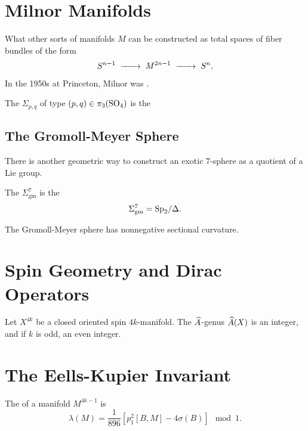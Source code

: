 
\section{Milnor Manifolds}

What other sorts of manifolds $M$ can be constructed as total spaces of fiber bundles of the form
\[
	S^{n-1} \lkxto M^{2n-1} \lkxto S^n.
\]

\begin{historicalremark*}
	In the 1950s at Princeton, Milnor was \cite{milnor2000exotic}. 
\end{historicalremark*}


\begin{definition}
	The  $\Sigma_{p,q}$ of type $(p,q)\in \pi_3({\operatorname{SO}}_4)$ is the
\end{definition}

\subsection*{The Gromoll-Meyer Sphere}

There is another geometric way to construct an exotic $7$-sphere as a quotient of a Lie group.

\begin{definition}
	The  $\Sigma_{\mathrm{gm}}^7$ is the
	\[
		\Sigma_{\mathrm{gm}}^7 = {\operatorname{Sp}}_2/\Delta.
	\]
\end{definition}

\begin{theorem}
	The Gromoll-Meyer sphere has nonnegative sectional curvature.
\end{theorem}

\section{Spin Geometry and Dirac Operators}

\begin{theorem}
	Let $X^{4k}$ be a closed oriented spin $4k$-manifold. The $\widehat{A}$-genus $\widehat{A}(X)$ is an integer, and if $k$ is odd, an even integer.
\end{theorem}

\section{The Eells-Kupier Invariant}\label{sec:eells-kupier_invariant}

\begin{definition}
	The  of a manifold $M^{4k-1}$ is
	\[
		\lambda(M) = \frac{1}{896}\left[p_1^2[B, M] - 4\sigma(B)\right] \mod 1.
	\]
\end{definition}
